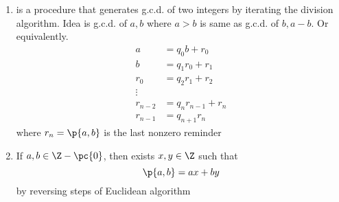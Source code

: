 \documentclass[11pt]{article}
\begin{document}
\begin{definition*}
\begin{enumerate}
        \item {} is a procedure that generates g.c.d. of two integers by iterating the division algorithm. Idea is g.c.d. of $a,b$ where $a>b$ is same as g.c.d. of $b,a-b$. Or equivalently. 
        \begin{align*}
            a &= q_0 b + r_0 \\
            b &= q_1 r_0 + r_1 \\
            r_0 &= q_2 r_1 + r_2 \\
            \vdots \\
            r_{n-2} &= q_n r_{n-1} + r_n \\
            r_{n-1} &= q_{n+1} r_n
        \end{align*}
        where $r_n = \p{a,b}$ is the last nonzero reminder
        \item {} If $a,b\in \Z -\pc{0}$, then exists $x,y\in\Z$ such that 
        \[
            \p{a,b} = ax + by    
        \]
        by reversing steps of Euclidean algorithm
    \end{enumerate}
\end{definition*}


\newpage
\section{}
\end{document}
